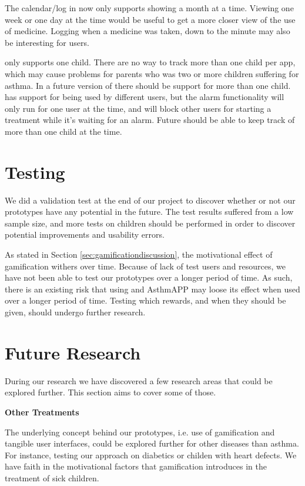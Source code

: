 The calendar/log in \app{} now only supports showing a month at a time. Viewing one week or one day at the time would be useful to get a more closer view of the use of medicine. Logging when a medicine was taken, down to the minute may also be interesting for users. 

\app{} only supports one child. There are no way to track more than one child per app, which may cause problems for parents who was two or more children suffering for asthma. In a future version of \app{} there should be support for more than one child. \ab{} has support for being used by different users, but the alarm functionality will only run for one user at the time, and will block other users for starting a treatment while it's waiting for an alarm. Future \ab{} should be able to keep track of more than one child at the time. 


\section{Testing}

We did a validation test at the end of our project to discover whether or not our prototypes have any potential in the future. The test results suffered from a low sample size, and more tests on children should be performed in order to discover potential improvements and usability errors. 

As stated in Section \ref{sec:gamificationdiscussion}, the motivational effect of gamification withers over time. Because of lack of test users and resources, we have not been able to test our prototypes over a longer period of time. As such, there is an existing risk that using \buddy{} and AsthmAPP may loose its effect when used over a longer period of time. Testing which rewards, and when they should be given, should undergo further research.   

\section{Future Research}

During our research we have discovered a few research areas that could be explored further. This section aims to cover some of those. 

\textbf{Other Treatments}

The underlying concept behind our prototypes, i.e. use of gamification and tangible user interfaces, could be explored further for other diseases than asthma. For instance, testing our approach on diabetics or childen with heart defects. We have faith in the motivational factors that gamification introduces in the treatment of sick children. 

